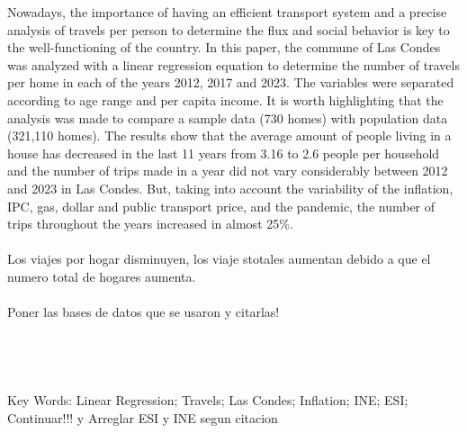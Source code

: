 \documentclass[12pt]{article} %
\begin{document}
\begin{titlepage}
\begin{justify}
    Nowadays, the importance of having an efficient transport 
    system and a precise analysis of travels per person to 
    determine the flux and social behavior is key to the 
    well-functioning of the country.  In this paper, the commune 
    of Las Condes was analyzed with a linear regression equation to 
    determine the number of travels per home in each of the years 2012, 
    2017 and 2023. The variables were separated according to age range 
    and per capita income. It is worth highlighting that the analysis 
    was made to compare a sample data (730 homes) with population data (321,110 homes). 
    The results show that the average amount of people living in a house has decreased 
    in the last 11 years from 3.16 to 2.6 people per household and the number of trips 
    made in a year did not vary considerably between 2012 and 2023 in Las Condes. 
    But, taking into account the variability of the inflation, IPC, gas, dollar and public transport price, 
    and the pandemic, the number of trips throughout the years increased in almost 25\%. 
    \\ \\
    Los viajes por hogar disminuyen, los viaje stotales aumentan debido a que el numero total de hogares aumenta.
    \\ \\
    Poner las bases de datos que se usaron y citarlas!
    \\ \\ \\ \\ \\
    Key Words: Linear Regression; Travels; Las Condes; Inflation; INE; ESI; Continuar!!! y Arreglar ESI y INE segun citacion
\end{justify}


\vspace{1cm}

\end{titlepage}

\end{document}
